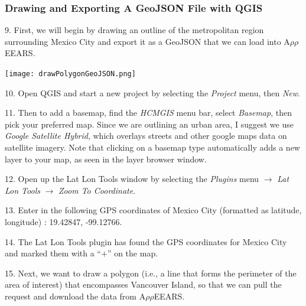 \documentclass[oneside,a4paper,11pt,explicit]{book}
\begin{document}
\subsubsection{Drawing and Exporting A GeoJSON File with QGIS}

9. First, we will begin by drawing an outline of the metropolitan region surrounding Mexico City and export it as a GeoJSON that we can load into A$\rho\rho$EEARS. 

\vspace{.5em}

\centerline{\texttt{[image: drawPolygonGeoJSON.png]}}

\vspace{.5em}

10. Open QGIS and start a new project by selecting the \textit{Project} menu, then \textit{New}.

11. Then to add a basemap, find the \textit{HCMGIS} menu bar, select \textit{Basemap}, then pick your preferred map. Since we are outlining an urban area, I suggest we use \textit{Google Satellite Hybrid}, which overlays streets and other google maps data on satellite imagery. Note that clicking on a basemap type automatically adds a new layer to your map, as seen in the layer browser window.

12. Open up the Lat Lon Tools window by selecting the \textit{Plugins} menu $\rightarrow$ \textit{Lat Lon Tools} $\rightarrow$ \textit{Zoom To Coordinate}.
	
13. Enter in the following GPS coordinates of Mexico City (formatted as latitude, longitude) : 19.42847, -99.12766.
	
14. The Lat Lon Tools plugin has found the GPS coordinates for Mexico City and marked them with a ``$+$'' on the map. 

15. Next, we want to draw a polygon (i.e., a line that forms the perimeter of the area of interest) that encompasses Vancouver Island, so that we can pull the request and download the data from A$\rho\rho$EEARS.
	
\end{document}
